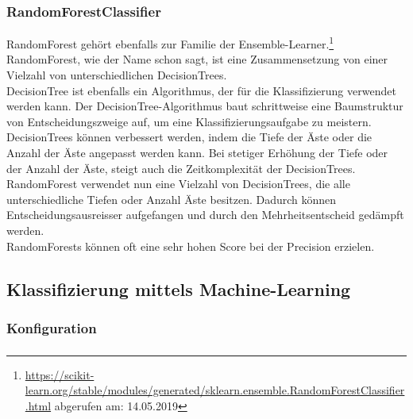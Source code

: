 \subsubsection{RandomForestClassifier}
RandomForest gehört ebenfalls zur Familie der Ensemble-Learner.\footnote{\url{https://scikit-learn.org/stable/modules/generated/sklearn.ensemble.RandomForestClassifier.html} abgerufen am: 14.05.2019}
RandomForest, wie der Name schon sagt, ist eine Zusammensetzung von einer Vielzahl von unterschiedlichen DecisionTrees.\\
DecisionTree ist ebenfalls ein Algorithmus, der für die Klassifizierung verwendet werden kann.
Der DecisionTree-Algorithmus baut schrittweise eine Baumstruktur von Entscheidungszweige auf, um eine Klassifizierungsaufgabe zu meistern. 
DecisionTrees können verbessert werden, indem die Tiefe der Äste oder die Anzahl der Äste angepasst werden kann.
Bei stetiger Erhöhung der Tiefe oder der Anzahl der Äste, steigt auch die Zeitkomplexität der DecisionTrees.\\
RandomForest verwendet nun eine Vielzahl von DecisionTrees, die alle unterschiedliche Tiefen oder Anzahl Äste besitzen.
Dadurch können Entscheidungsausreisser aufgefangen und durch den Mehrheitsentscheid gedämpft werden.\\
RandomForests können oft eine sehr hohen Score bei der Precision erzielen.
\subsection{Klassifizierung mittels Machine-Learning}
\subsubsection{Konfiguration}
\subsubsection{}
